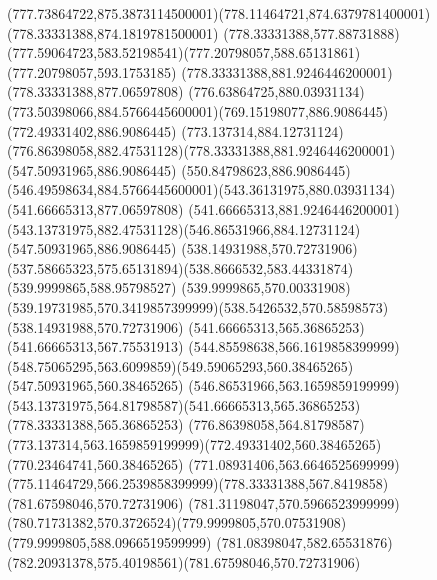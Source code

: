 {{\curveto(777.73864722,875.3873114500001)(778.11464721,874.6379781400001)(778.33331388,874.1819781500001)
\lineto(778.33331388,577.88731888)
\curveto(777.59064723,583.52198541)(777.20798057,588.65131861)(777.20798057,593.1753185)
\closepath
\moveto(778.33331388,881.9246446200001)
\lineto(778.33331388,877.06597808)
\curveto(776.63864725,880.03931134)(773.50398066,884.5766445600001)(769.15198077,886.9086445)
\lineto(772.49331402,886.9086445)
\curveto(773.137314,884.12731124)(776.86398058,882.47531128)(778.33331388,881.9246446200001)
\moveto(547.50931965,886.9086445)
\lineto(550.84798623,886.9086445)
\curveto(546.49598634,884.5766445600001)(543.36131975,880.03931134)(541.66665313,877.06597808)
\lineto(541.66665313,881.9246446200001)
\curveto(543.13731975,882.47531128)(546.86531966,884.12731124)(547.50931965,886.9086445)
\moveto(538.14931988,570.72731906)
\curveto(537.58665323,575.65131894)(538.8666532,583.44331874)(539.9999865,588.95798527)
\lineto(539.9999865,570.00331908)
\curveto(539.19731985,570.3419857399999)(538.5426532,570.58598573)(538.14931988,570.72731906)
\moveto(541.66665313,565.36865253)
\lineto(541.66665313,567.75531913)
\curveto(544.85598638,566.1619858399999)(548.75065295,563.6099859)(549.59065293,560.38465265)
\lineto(547.50931965,560.38465265)
\curveto(546.86531966,563.1659859199999)(543.13731975,564.81798587)(541.66665313,565.36865253)
\moveto(778.33331388,565.36865253)
\curveto(776.86398058,564.81798587)(773.137314,563.1659859199999)(772.49331402,560.38465265)
\lineto(770.23464741,560.38465265)
\curveto(771.08931406,563.6646525699999)(775.11464729,566.2539858399999)(778.33331388,567.8419858)
\closepath
\moveto(781.67598046,570.72731906)
\curveto(781.31198047,570.5966523999999)(780.71731382,570.3726524)(779.9999805,570.07531908)
\lineto(779.9999805,588.0966519599999)
\curveto(781.08398047,582.65531876)(782.20931378,575.40198561)(781.67598046,570.72731906)
}
}
